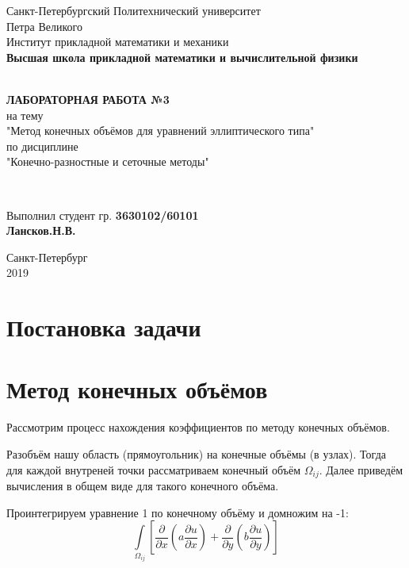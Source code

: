 \documentclass[12pt]{article}
\renewcommand{\listoffigures}{\begingroup  %
\tocsection
\tocfile{\listfigurename}{lof}
\endgroup}
\renewcommand{\listoftables}{\begingroup  %
\tocsection
\tocfile{\listtablename}{lot}
\endgroup}
\begin{document}
\begin{titlepage}
	\center
		Санкт-Петербургский Политехнический 
		университет \\ Петра Великого\\
		Институт прикладной математики и механики
		\\ \textbf{Высшая школа прикладной математики и вычислительной физики}

	\vfill ~
	\textbf{
		\\ \large ЛАБОРАТОРНАЯ РАБОТА №3
	}
	\\	на тему 
	\\ "Метод конечных объёмов для уравнений эллиптического типа"
	\\ по дисциплине
	\\ "Конечно-разностные и сеточные методы"

	\vfill ~

	Выполнил студент гр. \textbf{3630102/60101} \\
	\textbf{Лансков.Н.В.} \\ 

\vfill

{\large}	Санкт-Петербург
\\ 2019
\end{titlepage}


\tableofcontents 
\newpage
\listoffigures
\newpage
\listoftables
\newpage

\section{Постановка задачи}
\section{Метод конечных объёмов}

Рассмотрим  процесс нахождения коэффициентов по методу конечных объёмов.

Разобъём нашу область (прямоугольник) на конечные объёмы (в узлах). Тогда для каждой внутреней точки рассматриваем конечный объём $\Omega_{ij}$. Далее приведём вычисления в общем виде для такого конечного объёма.

Проинтегрируем уравнение 1 по конечному объёму и домножим на -1:
$$
\int\limits_{\Omega_{ij}}{\left[ \dfrac{\partial}{\partial x}\left( a\dfrac{\partial u}{\partial x}\right) + \dfrac{\partial}{\partial y}\left( b\dfrac{\partial u}{\partial y}\right) \right]}
$$
\end{document}

